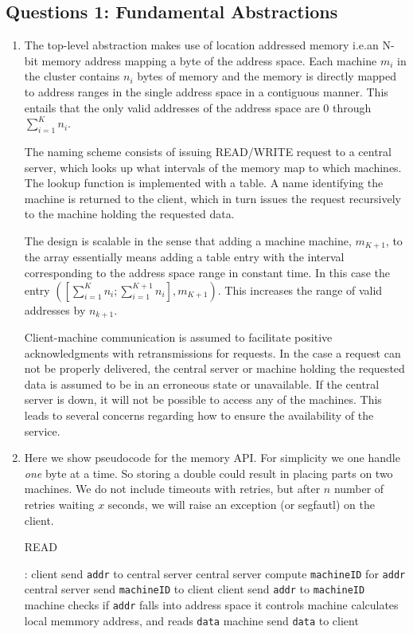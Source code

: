 \documentclass[11pt,a4paper,english]{article}
\begin{document}
\subsection{Questions 1: Fundamental Abstractions}
\begin{enumerate}
\item

  The top-level abstraction makes use of location addressed memory i.e.\@ an N-bit
  memory address mapping a byte of the address space. Each machine $m_i$
  in the cluster contains $n_i$
  bytes of memory and the memory is directly mapped to address ranges in the
  single address space in a contiguous manner. This entails that the only valid
  addresses of the address space are 0 through $\sum_{i=1}^{K} n_{i}$.

The naming scheme consists of issuing READ/WRITE request to a central server,
which looks up what intervals of the memory map to which machines. The lookup
function is implemented with a table. A name identifying the machine is returned
to the client, which in turn issues the request recursively to the machine holding the requested data.

The design is scalable in the sense that adding a machine machine, $m_{K+1}$,
to the array essentially means adding a table entry with the interval
corresponding to the address space range in constant time. In this case the
entry $([\sum_{i=1}^{K} n_{i}; \sum_{i=1}^{K+1} n_{i}], m_{K+1})$.
This increases the range of valid addresses by $n_{k+1}$.

Client-machine communication is assumed to facilitate positive acknowledgments
with retransmissions for requests. In the case a request can not be properly
delivered, the central server or machine holding the requested data is assumed
to be in an erroneous state or unavailable. If the central server is down, it
will not be possible to access any of the machines. This leads to several concerns regarding how to ensure the availability of the service.

\item Here we show pseudocode for the memory API. For simplicity we one handle
  \emph{one} byte at a time. So storing a double could result in placing parts on
  two machines. We do not include timeouts with retries, but after $n$ number of
  retries waiting $x$ seconds, we will raise an exception (or segfautl) on the client.

\begin{algorithm}[H]
\caption{READ}
\begin{algorithmic}[1]
:
\State client send \texttt{addr} to central server
\State central server compute \texttt{machineID} for \texttt{addr}
\State central server send \texttt{machineID} to client
\smallskip
\State client send \texttt{addr} to \texttt{machineID}
\State machine checks if \texttt{addr} falls into address space it controls
\State machine calculates local memmory address, and reads \texttt{data}
\State machine send \texttt{data} to client
\EndProcedure
\end{algorithmic}
\end{algorithm}


\end{enumerate}
\end{document}
